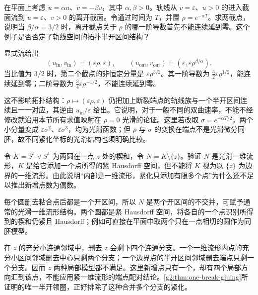 \begin{exercise}\label{g2:ex:unequal-hyperbolic-rates}
	在平面上考虑 \(\dot u=\alpha u\)、\(\dot v=-\beta v\)，其中 \(\alpha,\beta>0\)。轨线从 \(v=\varepsilon\)、\(u>0\) 的进入截面流到 \(u=\varepsilon\)、\(v>0\) 的离开截面。令通过时间为 \(T\)，并置 \(\rho=e^{-\alpha T}\)。求两截点，说明当 \(\beta/\alpha=3/2\) 时，离开截点关于 \(\rho\) 的哪一阶导数首先不能连续延到零。这个例子是否否定了轨线空间的拓扑半开区间结构？
\end{exercise}
\begin{solution}
	显式流给出
	\[
		(u_{\mathrm{in}},v_{\mathrm{in}})=(\varepsilon\rho,\varepsilon),\qquad
		(u_{\mathrm{out}},v_{\mathrm{out}})
		=(\varepsilon,\varepsilon\rho^{\beta/\alpha}).
	\]
	当比值为 \(3/2\) 时，第二个截点的非恒定分量是 \(\varepsilon\rho^{3/2}\)。其一阶导数为 \(\tfrac32\varepsilon\rho^{1/2}\)，能连续延到零；二阶导数为 \(\tfrac34\varepsilon\rho^{-1/2}\)，不能连续延到零。

	这不影响拓扑结构：\(\rho\mapsto(\varepsilon\rho,\varepsilon)\) 仍把加上断裂端点的轨线族与一个半开区间连续且一一对应，其逆由 \(u_{\mathrm{in}}/\varepsilon\) 给出。它说明，对于一般不同的双曲速率，不能不经修改就沿用本节所有求值映射在 \(\rho=0\) 光滑的论证。这里若改取 \(\sigma=e^{-\alpha T/2}\)，两个小分量变成 \(\varepsilon\sigma^2\)、\(\varepsilon\sigma^3\)，均为光滑函数；但 \(\rho\) 与 \(\sigma\) 的变换在端点不是光滑微分同胚，故不同紧化坐标的光滑结构也须明确比较。
\end{solution}

\begin{exercise}\label{g2:ex:compactification-needs-collars}
	令 \(K=S^1\vee S^1\) 为两圆在一点 \(z\) 处的楔和，令 \(N=K\setminus\{z\}\)。验证 \(N\) 是光滑一维流形，\(K\) 是给它添加一个点所得的紧 Hausdorff 空间，但不能将 \(K\) 视为以 \(\{z\}\) 为边界的一维流形。由此说明“内部是一维流形，紧化只添加有限多个点”为什么还不足以推出新增点数为偶数。
\end{exercise}
\begin{solution}
	每个圆删去粘合点后都是一个开区间，所以 \(N\) 是两个开区间的不交并，可赋予通常的光滑一维流形结构。两个圆都是紧 Hausdorff 空间，将各自的一个点识别所得到的楔和仍紧且 Hausdorff；例如可直接在平面中取两个只在一点相切的圆作为同胚模型。

	在 \(z\) 的充分小连通邻域中，删去 \(z\) 会剩下四个连通分支。一个一维流形内点的充分小区间邻域删去中心只剩两个分支；一个边界点的半开区间邻域删去端点只剩一个分支。因而 \(z\) 两种局部模型都不满足。这里新增点只有一个，却有四个局部方向汇到该点，不能应用紧一维流形的端点配对结论。\cref{g2:thm:one-break-gluing}所证明的唯一半开领圈，正好排除了这种合并多个分支的紧化。
\end{solution}

